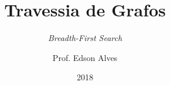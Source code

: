 \title{Travessia de Grafos}
\subtitle{\textit{Breadth-First Search}}
\date{2018}
\author{Prof. Edson Alves}

